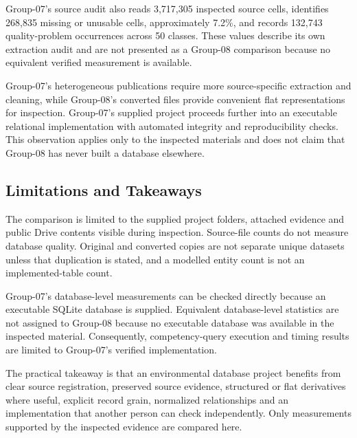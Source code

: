 Group-07's source audit also reads 3,717,305 inspected source cells,
identifies 268,835 missing or unusable cells, approximately 7.2\%, and records
132,743 quality-problem occurrences across 50 classes. These values describe
its own extraction audit and are not presented as a Group-08 comparison because
no equivalent verified measurement is available.

Group-07's heterogeneous publications require more source-specific extraction
and cleaning, while Group-08's converted files provide convenient flat
representations for inspection. Group-07's supplied project proceeds further
into an executable relational implementation with automated integrity and
reproducibility checks. This observation applies only to the inspected
materials and does not claim that Group-08 has never built a database elsewhere.

\subsection{Limitations and Takeaways}
\label{subsec:comparison-limitations-takeaways}

The comparison is limited to the supplied project folders, attached evidence
and public Drive contents visible during inspection. Source-file counts do not
measure database quality. Original and converted copies are not separate unique
datasets unless that duplication is stated, and a modelled entity count is not
an implemented-table count.

Group-07's database-level measurements can be checked directly because an
executable SQLite database is supplied. Equivalent database-level statistics
are not assigned to Group-08 because no executable database was available in
the inspected material. Consequently, competency-query execution and timing
results are limited to Group-07's verified implementation.

The practical takeaway is that an environmental database project benefits from
clear source registration, preserved source evidence, structured or flat
derivatives where useful, explicit record grain, normalized relationships and
an implementation that another person can check independently. Only
measurements supported by the inspected evidence are compared here.
